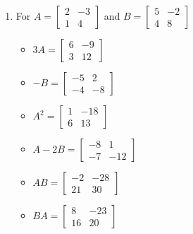 \begin{enumerate}

\item For  $A = \left[ \begin{array}{rr} 2 & -3 \\ 1 & 4 \end{array} \right]$ and $B=\left[ \begin{array}{rr} 5 & -2 \\ 4 & 8 \end{array} \right]$ 

\begin{multicols}{3}
\begin{itemize}
\item  $3A = \left[ \begin{array}{rr} 6 & -9 \\ 3 & 12 \end{array} \right]$

\item $-B = \left[ \begin{array}{rr} -5 & 2 \\ -4 & -8 \end{array} \right]$

\item $A^2 = \left[ \begin{array}{rr} 1 & -18 \\ 6 & 13 \end{array} \right]$

\end{itemize}
\end{multicols}


\begin{multicols}{3}
\begin{itemize}
\item  $A-2B = \left[ \begin{array}{rr} -8 & 1 \\ -7 & -12 \end{array} \right]$

\item $AB = \left[ \begin{array}{rr} -2 & -28 \\ 21 & 30 \end{array} \right]$

\item $BA = \left[ \begin{array}{rr} 8 & -23 \\ 16 & 20 \end{array} \right]$


\end{itemize}
\end{multicols}
\end{enumerate}
